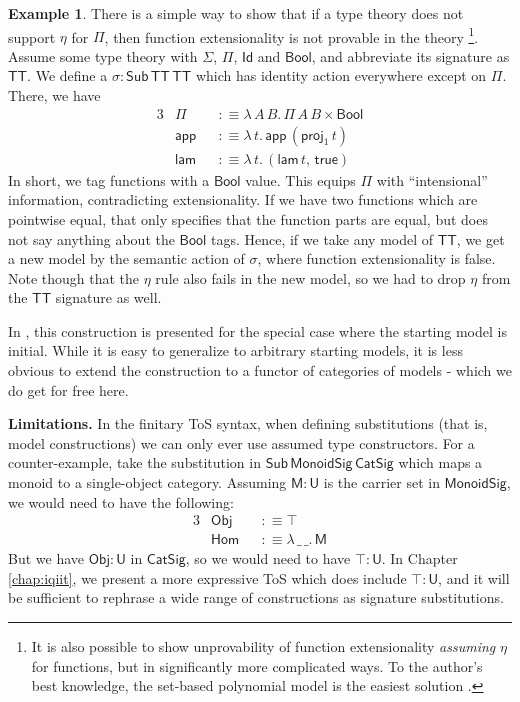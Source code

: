 \documentclass[12pt,a4paper,twoside,openany]{book}
\theoremstyle{remark}
\theoremstyle{definition}
\newtheorem{myexample}{Example}
\theoremstyle{theorem}
\newcommand{\ms}[1]{\mathsf{#1}}
\newcommand{\Sub}{\mathsf{Sub}}
\newcommand{\U}{\mathsf{U}}
\newcommand{\Id}{\mathsf{Id}}
\newcommand{\proj}{\mathsf{proj}}
\newcommand{\app}{\ms{app}}
\newcommand{\Obj}{\ms{Obj}}
\newcommand{\Bool}{\ms{Bool}}
\newcommand{\lam}{\ms{lam}}
\newcommand{\true}{\ms{true}}
\newcommand{\defn}{:\equiv}
\begin{document}
\begin{myexample}
There is a simple way to show that if a type theory does not support $\eta$ for
$\Pi$, then function extensionality is not provable in the theory
\cite{next700}\footnote{It is also possible to show unprovability of function
extensionality \emph{assuming} $\eta$ for functions, but in significantly more
complicated ways. To the author's best knowledge, the set-based polynomial model
is the easiest solution \cite{TODO}.}.  Assume some type theory with $\Sigma$,
$\Pi$, $\Id$ and $\Bool$, and abbreviate its signature as $\ms{TT}$. We define a
$\sigma : \Sub\,\ms{TT}\,\ms{TT}$ which has identity action everywhere except on
$\Pi$. There, we have
\begin{alignat*}{3}
  &\Pi    &&\defn \lambda\,A\,B.\,\Pi\,A\,B \times \Bool \\
  &\app   &&\defn \lambda\,t.\,\app\,(\proj_1\,t)\\
  &\lam   &&\defn \lambda\,t.\,(\lam\,t,\,\true)
\end{alignat*}
In short, we tag functions with a $\Bool$ value. This equips $\Pi$ with
``intensional'' information, contradicting extensionality. If we have two
functions which are pointwise equal, that only specifies that the function parts
are equal, but does not say anything about the $\Bool$ tags. Hence, if we take
any model of $\ms{TT}$, we get a new model by the semantic action of $\sigma$,
where function extensionality is false. Note though that the $\eta$ rule also
fails in the new model, so we had to drop $\eta$ from the $\ms{TT}$ signature
as well.

In \cite{next700}, this construction is presented for the special case where the
starting model is initial. While it is easy to generalize to arbitrary starting
models, it is less obvious to extend the construction to a functor of categories
of models - which we do get for free here.
\end{myexample}

\textbf{Limitations.} In the finitary ToS syntax, when defining substitutions
(that is, model constructions) we can only ever use assumed type constructors.
For a counter-example, take the substitution in
$\Sub\,\ms{MonoidSig}\,\ms{CatSig}$ which maps a monoid to a single-object
category. Assuming $\ms{M} : \U$ is the carrier set in $\ms{MonoidSig}$, we would
need to have the following:
\begin{alignat*}{3}
  &\ms{Obj} &&\defn \top \\
  &\ms{Hom} &&\defn \lambda\,\_\,\_.\, \ms{M}
\end{alignat*}
But we have $\Obj : \U$ in $\ms{CatSig}$, so we would need to have $\top : \U$.
In Chapter \ref{chap:iqiit}, we present a more expressive ToS which does include
$\top : \U$, and it will be sufficient to rephrase a wide range of constructions
as signature substitutions.
\end{document}
